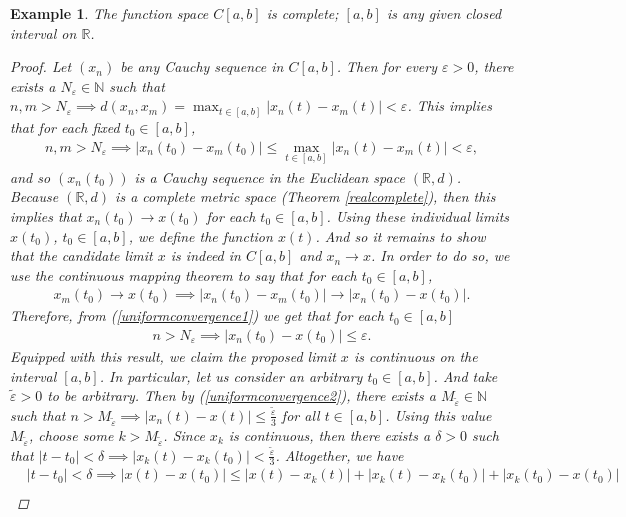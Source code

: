\documentclass[11pt]{article}
\theoremstyle{mystyle}
\newtheorem{protoexamp}{Example}[section]
\newenvironment{examp}
{\colorlet{shadecolor}{orange!15}\begin{shaded}\begin{protoexamp}}
{\end{protoexamp}\end{shaded}}
\begin{document}
\begin{examp}\label{functioncomplete}
The function space $C[a, b]$ is complete; $[a,b]$ is any given closed interval on $\mathbb{R}$.
\begin{proof}
Let $(x_n)$ be any Cauchy sequence in $C[a, b]$. Then for every $\varepsilon > 0$, there exists a $N_{\varepsilon} \in \mathbb{N}$ such that $n, m > N_{\varepsilon} \implies d(x_n, x_m) = \max_{t \in [a, b]}|x_n(t) - x_m(t)| < \varepsilon$. This implies that for each fixed $t_0 \in [a, b]$, 
\begin{align}\label{uniformconvergence1}
    n, m > N_{\varepsilon} \implies |x_n(t_0) - x_m(t_0)| \leq \max_{t \in [a, b]}|x_n(t) - x_m(t)| < \varepsilon,
\end{align}
and so $(x_n(t_0))$ is a Cauchy sequence in the Euclidean space $(\mathbb{R}, d)$. Because $(\mathbb{R}, d)$ is a complete metric space (Theorem \ref{realcomplete}), then this implies that $x_n(t_0) \longrightarrow x(t_0)$ for each $t_0 \in [a, b]$. Using these individual limits $x(t_0)$, $t_0 \in [a, b]$, we define the function $x(t)$.\newline
And so it remains to show that the candidate limit $x$ is indeed in $C[a, b]$ and $x_n \longrightarrow x$. In order to do so, we use the continuous mapping theorem to say that for each $t_0 \in [a, b]$, 
\begin{align*}
x_m(t_0) \longrightarrow x(t_0) \implies |x_n(t_0) - x_m(t_0)| \longrightarrow |x_n(t_0) - x(t_0)|.
\end{align*}
Therefore, from (\ref{uniformconvergence1}) we get that for each $t_0 \in [a, b]$
\begin{align}\label{uniformconvergence2}
    n > N_{\varepsilon} \implies |x_n(t_0) - x(t_0)| \leq \varepsilon.
\end{align}
Equipped with this result, we claim the proposed limit $x$ is continuous on the interval $[a, b]$. In particular, let us consider an arbitrary $t_0 \in [a, b]$. And take $\tilde{\varepsilon} > 0$ to be arbitrary. Then by (\ref{uniformconvergence2}), there exists a $M_{\tilde{\varepsilon}} \in \mathbb{N}$ such that $n > M_{\tilde{\varepsilon}} \implies |x_n(t) - x(t)| \leq \frac{\tilde{\varepsilon}}{3}$ for all $t \in [a, b]$.
Using this value $M_{\tilde{\varepsilon}}$, choose some $k > M_{\tilde{\varepsilon}}$. Since $x_k$ is continuous, then there exists a $\delta > 0$ such that $|t - t_0| < \delta \implies |x_k(t) - x_k(t_0)| < \frac{\tilde{\varepsilon}}{3}$. Altogether, we have
\begin{align*}
    &|t - t_0| < \delta \implies |x(t) - x(t_0)| \leq |x(t) - x_k(t)| + |x_k(t) - x_k(t_0)| + |x_k(t_0) - x(t_0)|\\

\end{align*}
\end{proof}
\end{examp}
\end{document}
